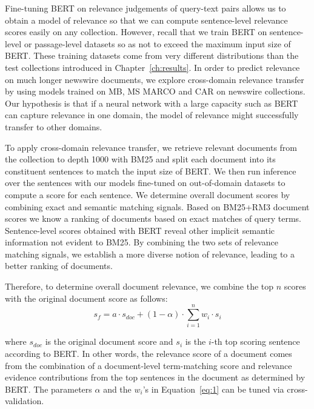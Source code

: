Fine-tuning BERT on relevance judgements of query-text pairs allows us to obtain a model of relevance so that we can compute sentence-level relevance scores easily on any collection.
However, recall that we train BERT on sentence-level or passage-level datasets so as not to exceed the maximum input size of BERT.
These training datasets come from very different distributions than the test collections introduced in Chapter~\ref{ch:results}.
In order to predict relevance on much longer newswire documents, we explore cross-domain relevance transfer by using models trained on MB, MS MARCO and CAR on newswire collections.
Our hypothesis is that if a neural network with a large capacity such as BERT can capture relevance in one domain, the model of relevance might successfully transfer to other domains.

To apply cross-domain relevance transfer, we retrieve relevant documents from the collection to depth 1000 with BM25 and split each document into its constituent sentences to match the input size of BERT.
We then run inference over the sentences with our models fine-tuned on out-of-domain datasets to compute a score for each sentence.
We determine overall document scores by combining exact and semantic matching signals.
Based on BM25+RM3 document scores we know a ranking of documents based on exact matches of query terms.
Sentence-level scores obtained with BERT reveal other implicit semantic information not evident to BM25.
By combining the two sets of relevance matching signals, we establish a more diverse notion of relevance, leading to a better ranking of documents.

Therefore, to determine overall document relevance, we combine the top $ n $ scores with the original document score as follows:
\begin{equation} \label{eq:1}
s_f = a \cdot s_{doc}  + (1 - \alpha) \cdot \sum_{i = 1}^n w_i \cdot s_i
\end{equation}

\noindent where $ s_{doc} $ is the original document score and $ s_i $ is the $ i $-th top scoring sentence according to BERT.
In other words, the relevance score of a document comes from the combination of a document-level term-matching score and relevance evidence contributions from the top sentences in the document as determined by BERT.
The parameters $ \alpha $ and the $ w_i $'s in Equation~\ref{eq:1} can be tuned via cross-validation.

